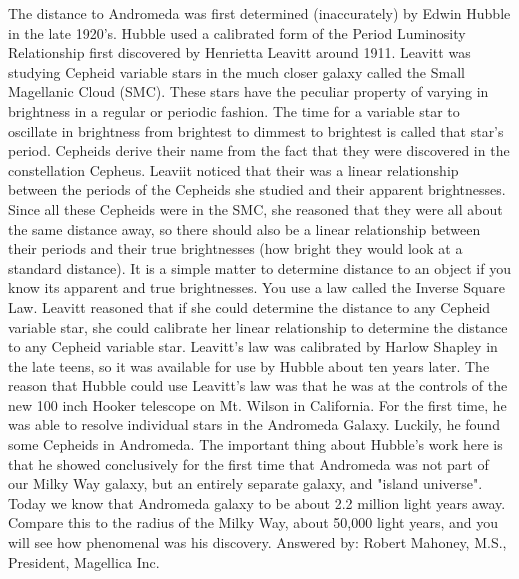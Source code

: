 \documentclass{../template/texnote}
\begin{document}
The distance to Andromeda was first determined (inaccurately) by Edwin Hubble in the late 1920's. Hubble used a calibrated form of the Period Luminosity Relationship first discovered by Henrietta Leavitt around 1911. Leavitt was studying Cepheid variable stars in the much closer galaxy called the Small Magellanic Cloud (SMC). These stars have the peculiar property of varying in brightness in a regular or periodic fashion. The time for a variable star to oscillate in brightness from brightest to dimmest to brightest is called that star's period. Cepheids derive their name from the fact that they were discovered in the constellation Cepheus. Leaviit noticed that their was a linear relationship between the periods of the Cepheids she studied and their apparent brightnesses. Since all these Cepheids were in the SMC, she reasoned that they were all about the same distance away, so there should also be a linear relationship between their periods and their true brightnesses (how bright they would look at a standard distance). It is a simple matter to determine distance to an object if you know its apparent and true brightnesses. You use a law called the Inverse Square Law. Leavitt reasoned that if she could determine the distance to any Cepheid variable star, she could calibrate her linear relationship to determine the distance to any Cepheid variable star. Leavitt's law was calibrated by Harlow Shapley in the late teens, so it was available for use by Hubble about ten years later. The reason that Hubble could use Leavitt's law was that he was at the controls of the new 100 inch Hooker telescope on Mt. Wilson in California. For the first time, he was able to resolve individual stars in the Andromeda Galaxy. Luckily, he found some Cepheids in Andromeda. The important thing about Hubble's work here is that he showed conclusively for the first time that Andromeda was not part of our Milky Way galaxy, but an entirely separate galaxy, and "island universe". Today we know that Andromeda galaxy to be about 2.2 million light years away. Compare this to the radius of the Milky Way, about 50,000 light years, and you will see how phenomenal was his discovery.
Answered by: Robert Mahoney, M.S., President, Magellica Inc.
    \printbibliography
\end{document}
